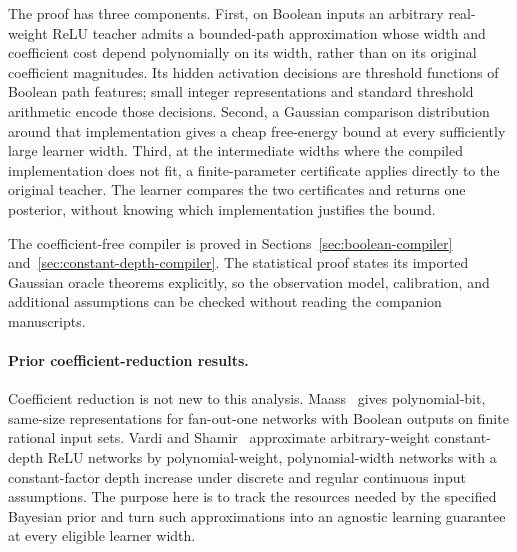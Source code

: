 \documentclass[11pt]{article}
\begin{document}
The proof has three components. First, on Boolean inputs an arbitrary real-weight ReLU teacher admits a bounded-path approximation whose width and coefficient cost depend polynomially on its width, rather than on its original coefficient magnitudes. Its hidden activation decisions are threshold functions of Boolean path features; small integer representations and standard threshold arithmetic encode those decisions. Second, a Gaussian comparison distribution around that implementation gives a cheap free-energy bound at every sufficiently large learner width. Third, at the intermediate widths where the compiled implementation does not fit, a finite-parameter certificate applies directly to the original teacher. The learner compares the two certificates and returns one posterior, without knowing which implementation justifies the bound.

The coefficient-free compiler is proved in Sections~\ref{sec:boolean-compiler} and~\ref{sec:constant-depth-compiler}. The statistical proof states its imported Gaussian oracle theorems explicitly, so the observation model, calibration, and additional assumptions can be checked without reading the companion manuscripts.

\paragraph{Prior coefficient-reduction results.}
Coefficient reduction is not new to this analysis. Maass~\cite{maass} gives polynomial-bit, same-size representations for fan-out-one networks with Boolean outputs on finite rational input sets. Vardi and Shamir~\cite{vardi-shamir} approximate arbitrary-weight constant-depth ReLU networks by polynomial-weight, polynomial-width networks with a constant-factor depth increase under discrete and regular continuous input assumptions. The purpose here is to track the resources needed by the specified Bayesian prior and turn such approximations into an agnostic learning guarantee at every eligible learner width.
\end{document}
